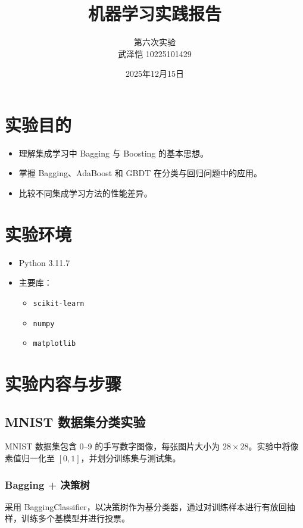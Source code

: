 \documentclass{article}
\title{\heiti\textbf{机器学习实践报告}}
\author{第六次实验 \\ 
武泽恺 10225101429
}
\date{2025年12月15日}
\begin{document}
\maketitle

\section{实验目的}
\begin{itemize}
  \item 理解集成学习中 Bagging 与 Boosting 的基本思想。
  \item 掌握 Bagging、AdaBoost 和 GBDT 在分类与回归问题中的应用。
  \item 比较不同集成学习方法的性能差异。
\end{itemize}

\section{实验环境}
\begin{itemize}
    \item Python 3.11.7
    \item 主要库：
    \begin{itemize}
        \item \texttt{scikit-learn}
        \item \texttt{numpy}
        \item \texttt{matplotlib}
    \end{itemize}
\end{itemize}

\section{实验内容与步骤}

\subsection{MNIST 数据集分类实验}

MNIST 数据集包含 0–9 的手写数字图像，每张图片大小为 $28\times28$。实验中将像素值归一化至 $[0,1]$，并划分训练集与测试集。

\subsubsection{Bagging + 决策树}

采用 BaggingClassifier，以决策树作为基分类器，通过对训练样本进行有放回抽样，训练多个基模型并进行投票。
\end{document}
